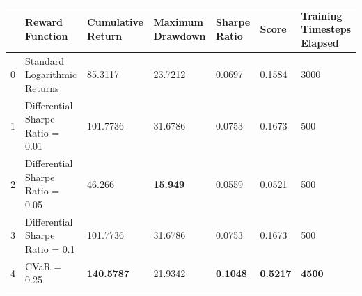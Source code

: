 \begin{tabular}{lllllll}
\toprule
 & Reward Function & Cumulative Return & Maximum Drawdown & Sharpe Ratio & Score & Training Timesteps Elapsed \\
\midrule
0 & Standard Logarithmic Returns & 85.3117 & 23.7212 & 0.0697 & 0.1584 & 3000 \\
1 & Differential Sharpe Ratio = 0.01 & 101.7736 & 31.6786 & 0.0753 & 0.1673 & 500 \\
2 & Differential Sharpe Ratio = 0.05 & 46.266 & \textbf{15.949} & 0.0559 & 0.0521 & 500 \\
3 & Differential Sharpe Ratio = 0.1 & 101.7736 & 31.6786 & 0.0753 & 0.1673 & 500 \\
4 & CVaR = 0.25 & \textbf{140.5787} & 21.9342 & \textbf{0.1048} & \textbf{0.5217} & \textbf{4500} \\
\bottomrule
\end{tabular}
